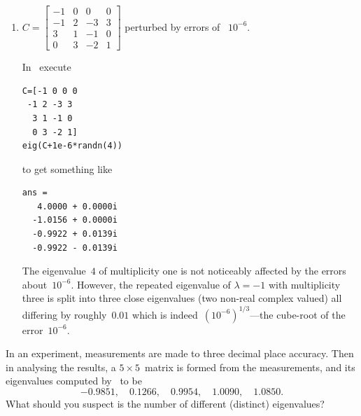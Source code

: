 \begin{example}
\begin{enumerate}
\begin{solution}
Depending upon the random numbers, other possible answers are like
\begin{verbatim}
ans =
   0.0001 + 0.0157i
   0.0001 - 0.0157i
   6.4146 + 0.0000i
   4.9993 + 0.0000i
   3.5860 + 0.0000i
\end{verbatim}
where the repeated eigenvalue of zero splits to be a pair of non-real complex valued eigenvalues of roughly \(\pm \i\sqrt{0.0001}=\pm \i0.01\)\,.
\end{solution}



\item \(C=\begin{bmatrix}-1&0&0&0
\\-1&2&-3&3
\\3&1&-1&0
\\0&3&-2&1\end{bmatrix}\) perturbed by errors of ~\(10^{-6}\).
\begin{solution} 
In \script\ execute
\begin{verbatim}
C=[-1 0 0 0
 -1 2 -3 3
  3 1 -1 0
  0 3 -2 1]
eig(C+1e-6*randn(4))
\end{verbatim}
\setbox\ajrqrbox\hbox{}%
\marginajrbox%
to get something like
\begin{verbatim}
ans =
   4.0000 + 0.0000i
  -1.0156 + 0.0000i
  -0.9922 + 0.0139i
  -0.9922 - 0.0139i
\end{verbatim}
The eigenvalue~\(4\) of multiplicity one is not noticeably affected by the errors about~\(10^{-6}\).
However, the repeated eigenvalue of \(\lambda=-1\) with multiplicity three is split into three close eigenvalues (two non-real complex valued) all differing by roughly~\(0.01\) which is indeed~\((10^{-6})^{1/3}\)---the cube-root of the error~\(10^{-6}\).
\end{solution}

\end{enumerate}
\end{example}






\begin{activity}
In an experiment, measurements are made to three decimal place accuracy.
Then in analysing the results, a \(5\times5\)~matrix is formed from the measurements, and its eigenvalues computed by \script\ to be
\begin{equation*}
-0.9851,\quad
0.1266,\quad
0.9954,\quad
1.0090,\quad
1.0850.
\end{equation*}
What should you suspect is the number of different (distinct) eigenvalues?
\end{activity}








